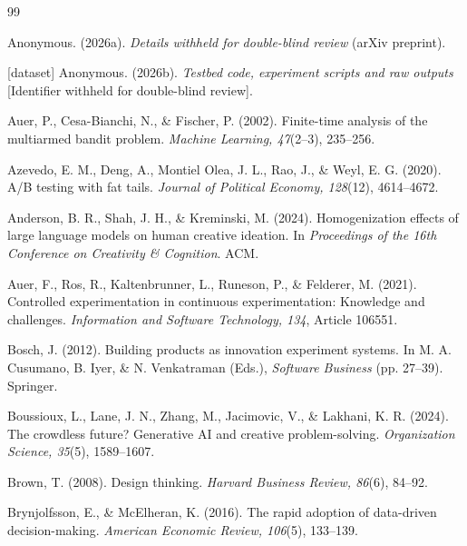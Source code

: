 \begin{thebibliography}{99}
\setlength{\itemsep}{1pt}

\ifanon
{} Anonymous. (2026a). \textit{Details withheld for double-blind review} (arXiv preprint).

 [dataset] Anonymous. (2026b). \textit{Testbed code, experiment scripts and raw outputs} [Identifier withheld for double-blind review].
\fi


 Auer, P., Cesa-Bianchi, N., \& Fischer, P. (2002). Finite-time analysis of the multiarmed bandit problem. \textit{Machine Learning, 47}(2--3), 235--256. 

 Azevedo, E. M., Deng, A., Montiel Olea, J. L., Rao, J., \& Weyl, E. G. (2020). A/B testing with fat tails. \textit{Journal of Political Economy, 128}(12), 4614--4672. 

 Anderson, B. R., Shah, J. H., \& Kreminski, M. (2024). Homogenization effects of large language models on human creative ideation. In \textit{Proceedings of the 16th Conference on Creativity \& Cognition}. ACM. 

 Auer, F., Ros, R., Kaltenbrunner, L., Runeson, P., \& Felderer, M. (2021). Controlled experimentation in continuous experimentation: Knowledge and challenges. \textit{Information and Software Technology, 134}, Article 106551. 

 Bosch, J. (2012). Building products as innovation experiment systems. In M. A. Cusumano, B. Iyer, \& N. Venkatraman (Eds.), \textit{Software Business} (pp. 27--39). Springer. 

 Boussioux, L., Lane, J. N., Zhang, M., Jacimovic, V., \& Lakhani, K. R. (2024). The crowdless future? Generative AI and creative problem-solving. \textit{Organization Science, 35}(5), 1589--1607. 

 Brown, T. (2008). Design thinking. \textit{Harvard Business Review, 86}(6), 84--92.

 Brynjolfsson, E., \& McElheran, K. (2016). The rapid adoption of data-driven decision-making. \textit{American Economic Review, 106}(5), 133--139. 


\end{thebibliography}
